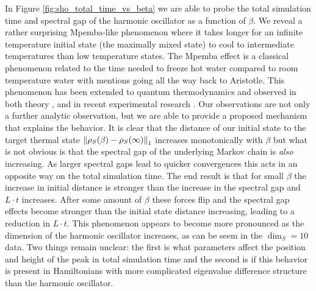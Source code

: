 In Figure \ref{fig:sho_total_time_vs_beta} we are able to probe the total simulation time and spectral gap of the harmonic oscillator as a function of $\beta$. We reveal a rather surprising Mpemba-like phenomenon where it takes longer for an infinite temperature initial state (the maximally mixed state) to cool to intermediate temperatures than low temperature states. The Mpemba effect \cite{mpemba} is a classical phenomenon related to the time needed to freeze hot water compared to room temperature water with mentions going all the way back to Aristotle. This phenomenon has been extended to quantum thermodynamics and observed in both theory \cite{nickMpemba}, \cite{mpembaExplanation} and in recent experimental research \cite{zhang2025mpembaObservation}. Our observations are not only a further analytic observation, but we are able to provide a proposed mechanism that explains the behavior. It is clear that the distance of our initial state to the target thermal state $\norm{\rho_S(\beta) - \rho_S(\infty)}_1$ increases monotonically with $\beta$ but what is not obvious is that the spectral gap of the underlying Markov chain is \emph{also} increasing. As larger spectral gaps lead to quicker convergences this acts in an opposite way on the total simulation time. The end result is that for small $\beta$ the increase in initial distance is stronger than the increase in the spectral gap and $L \cdot t$ increases. After some amount of $\beta$ these forces flip and the spectral gap effects become stronger than the initial state distance increasing, leading to a reduction in $L \cdot t$. This phenomenon appears to become more pronounced as the dimension of the harmonic oscillator increases, as can be seem in the $\dim_S = 10$ data. Two things remain unclear: the first is what parameters affect the position and height of the peak in total simulation time and the second is if this behavior is present in Hamiltonians with more complicated eigenvalue difference structure than the harmonic oscillator.

